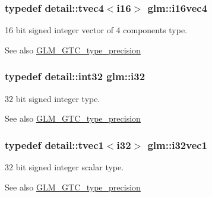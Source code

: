 \subsubsection[{i16vec4}]{\setlength{\rightskip}{0pt plus 5cm}typedef detail\+::tvec4$<$i16$>$ {\bf glm\+::i16vec4}}\label{group__gtc__type__precision_gaa5ac58e1f15cc47ae8f11cf9849cd9be}
16 bit signed integer vector of 4 components type. \begin{DoxySeeAlso}{See also}
\hyperlink{group__gtc__type__precision}{G\+L\+M\+\_\+\+G\+T\+C\+\_\+type\+\_\+precision} 
\end{DoxySeeAlso}
\hypertarget{group__gtc__type__precision_ga1d8ed5c43e91ea7d4528389da4fa9524}{}
\subsubsection[{i32}]{\setlength{\rightskip}{0pt plus 5cm}typedef detail\+::int32 {\bf glm\+::i32}}\label{group__gtc__type__precision_ga1d8ed5c43e91ea7d4528389da4fa9524}
32 bit signed integer type. \begin{DoxySeeAlso}{See also}
\hyperlink{group__gtc__type__precision}{G\+L\+M\+\_\+\+G\+T\+C\+\_\+type\+\_\+precision} 
\end{DoxySeeAlso}
\hypertarget{group__gtc__type__precision_gaffde115d86f11a3aa35c294de22eb028}{}
\subsubsection[{i32vec1}]{\setlength{\rightskip}{0pt plus 5cm}typedef detail\+::tvec1$<$i32$>$ {\bf glm\+::i32vec1}}\label{group__gtc__type__precision_gaffde115d86f11a3aa35c294de22eb028}
32 bit signed integer scalar type. \begin{DoxySeeAlso}{See also}
\hyperlink{group__gtc__type__precision}{G\+L\+M\+\_\+\+G\+T\+C\+\_\+type\+\_\+precision} 
\end{DoxySeeAlso}
\hypertarget{group__gtc__type__precision_gaa63418303dbcfc01d53f82f659eab5c1}{}
